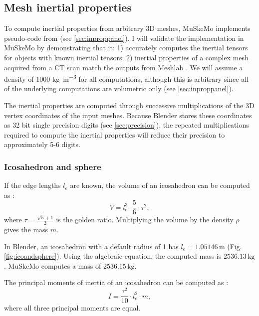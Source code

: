 \documentclass{article}
\begin{document}
\subsection{Mesh inertial properties}
\label{sec:inpropvalidation}
To compute inertial properties from arbitrary 3D meshes, MuSkeMo implements pseudo-code from \cite{eberlyGamePhysics2004} (see \ref{sec:inproppanel}). I will validate the implementation in MuSkeMo by demonstrating that it: 1) accurately computes the inertial tensors for objects with known inertial tensors; 2) inertial properties of a complex mesh acquired from a CT scan match the outputs from Meshlab \cite{cignoniMeshLabOpenSourceMesh2008}. We will assume a density of 1000 \si{kg m^{-3}} for all computations, although this is arbitrary since all of the underlying computations are volumetric only (see \ref{sec:inproppanel}).

The inertial properties are computed through successive multiplications of the 3D vertex coordinates of the input meshes. Because Blender stores these coordinates as 32 bit single precision digits (see \ref{sec:precision}), the repeated multiplications required to compute the inertial properties will reduce their precision to approximately 5-6 digits.

\subsubsection*{Icosahedron and sphere}

If the edge lengths \(l_{e}\) are known, the volume of an icosahedron can be computed as \cite{satterlyMomentsInertiaPolyhedra1958}:
\begin{equation}
V = l_{e}^3 \cdot \frac{5}{6} \cdot \tau^2,
\end{equation}
where \(\tau = \frac{\sqrt{5} + 1}{2}\) is the golden ratio. Multiplying the volume by the density \(\rho\) gives the mass \(m\).

In Blender, an icosahedron with a default radius of 1 has \(l_{e} = 1.05146 \, \si{\metre}\) (Fig. \ref{fig:icoandsphere}). Using the algebraic equation, the computed mass is \(2536.13 \, \si{\kilogram}\). MuSkeMo computes a mass of \(2536.15 \, \si{\kilogram}\). 

The principal moments of inertia of an icosahedron can be computed as \cite{satterlyMomentsInertiaPolyhedra1958}:
\begin{equation}
I = \frac{\tau^2}{10} \cdot l_{e}^2 \cdot m,
\end{equation}
where all three principal moments are equal.
\end{document}
